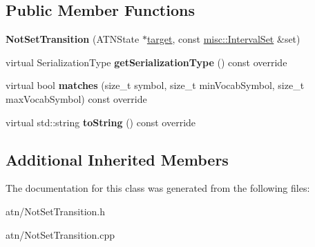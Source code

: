 \subsection*{Public Member Functions}
\begin{DoxyCompactItemize}
\item 
\mbox{\label{classantlr4_1_1atn_1_1NotSetTransition_a07ccf2a4cbabff225f3646d17071bf24}} 
{\bfseries Not\+Set\+Transition} (A\+T\+N\+State $\ast$\hyperlink{classantlr4_1_1atn_1_1Transition_aaaed7f4ddda71e156b36de33e88f66a7}{target}, const \hyperlink{classantlr4_1_1misc_1_1IntervalSet}{misc\+::\+Interval\+Set} \&set)
\item 
\mbox{\label{classantlr4_1_1atn_1_1NotSetTransition_ae508b030f9d464f9aae651f748195416}} 
virtual Serialization\+Type {\bfseries get\+Serialization\+Type} () const override
\item 
\mbox{\label{classantlr4_1_1atn_1_1NotSetTransition_a9515bb7349db5dd1c182b2178d05d5e9}} 
virtual bool {\bfseries matches} (size\+\_\+t symbol, size\+\_\+t min\+Vocab\+Symbol, size\+\_\+t max\+Vocab\+Symbol) const override
\item 
\mbox{\label{classantlr4_1_1atn_1_1NotSetTransition_aaf0304fc18661373e9429a81f0c7fe7b}} 
virtual std\+::string {\bfseries to\+String} () const override
\end{DoxyCompactItemize}
\subsection*{Additional Inherited Members}


The documentation for this class was generated from the following files\+:\begin{DoxyCompactItemize}
\item 
atn/Not\+Set\+Transition.\+h\item 
atn/Not\+Set\+Transition.\+cpp\end{DoxyCompactItemize}
